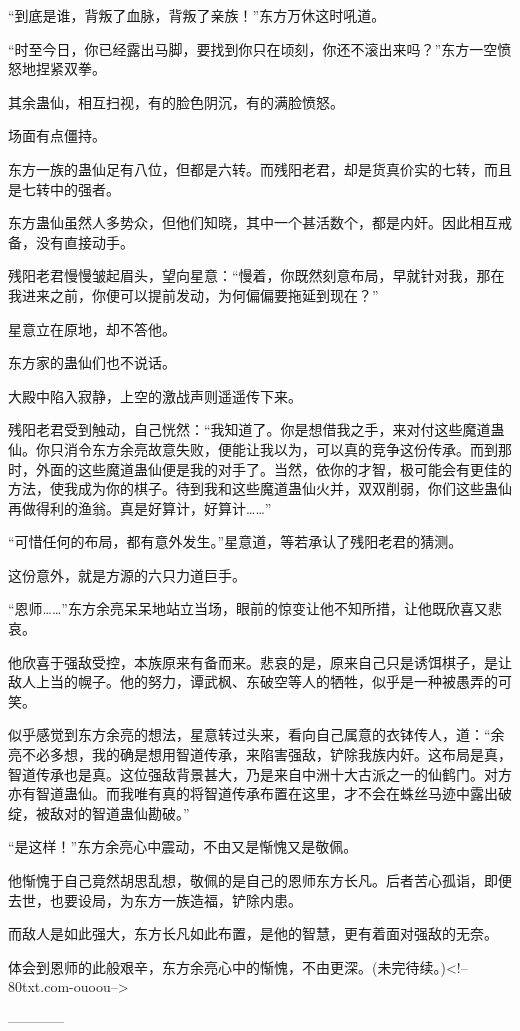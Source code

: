 \begin{this_body}
“到底是谁，背叛了血脉，背叛了亲族！”东方万休这时吼道。

“时至今日，你已经露出马脚，要找到你只在顷刻，你还不滚出来吗？”东方一空愤怒地捏紧双拳。

其余蛊仙，相互扫视，有的脸色阴沉，有的满脸愤怒。

场面有点僵持。

东方一族的蛊仙足有八位，但都是六转。而残阳老君，却是货真价实的七转，而且是七转中的强者。

东方蛊仙虽然人多势众，但他们知晓，其中一个甚活数个，都是内奸。因此相互戒备，没有直接动手。

残阳老君慢慢皱起眉头，望向星意：“慢着，你既然刻意布局，早就针对我，那在我进来之前，你便可以提前发动，为何偏偏要拖延到现在？”

星意立在原地，却不答他。

东方家的蛊仙们也不说话。

大殿中陷入寂静，上空的激战声则遥遥传下来。

残阳老君受到触动，自己恍然：“我知道了。你是想借我之手，来对付这些魔道蛊仙。你只消令东方余亮故意失败，便能让我以为，可以真的竞争这份传承。而到那时，外面的这些魔道蛊仙便是我的对手了。当然，依你的才智，极可能会有更佳的方法，使我成为你的棋子。待到我和这些魔道蛊仙火并，双双削弱，你们这些蛊仙再做得利的渔翁。真是好算计，好算计……”

“可惜任何的布局，都有意外发生。”星意道，等若承认了残阳老君的猜测。

这份意外，就是方源的六只力道巨手。

“恩师……”东方余亮呆呆地站立当场，眼前的惊变让他不知所措，让他既欣喜又悲哀。

他欣喜于强敌受控，本族原来有备而来。悲哀的是，原来自己只是诱饵棋子，是让敌人上当的幌子。他的努力，谭武枫、东破空等人的牺牲，似乎是一种被愚弄的可笑。

似乎感觉到东方余亮的想法，星意转过头来，看向自己属意的衣钵传人，道：“余亮不必多想，我的确是想用智道传承，来陷害强敌，铲除我族内奸。这布局是真，智道传承也是真。这位强敌背景甚大，乃是来自中洲十大古派之一的仙鹤门。对方亦有智道蛊仙。而我唯有真的将智道传承布置在这里，才不会在蛛丝马迹中露出破绽，被敌对的智道蛊仙勘破。”

“是这样！”东方余亮心中震动，不由又是惭愧又是敬佩。

他惭愧于自己竟然胡思乱想，敬佩的是自己的恩师东方长凡。后者苦心孤诣，即便去世，也要设局，为东方一族造福，铲除内患。

而敌人是如此强大，东方长凡如此布置，是他的智慧，更有着面对强敌的无奈。

体会到恩师的此般艰辛，东方余亮心中的惭愧，不由更深。(未完待续。)<!--80txt.com-ouoou-->

------------

\end{this_body}

